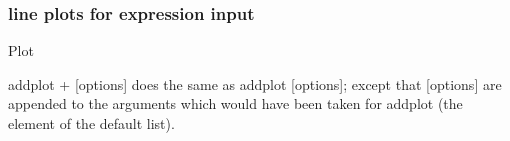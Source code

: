 \documentclass{beamer}
\begin{document}
\begin{frame}[fragile]
\frametitle{line plots for expression input}
\begin{block}{Plot}
\end{block}
\end{frame}
\begin{frame}[fragile]
\color{blue} addplot \color{black} + [options] does the same as \color{blue} addplot \color{black} [options]; except that [options] are appended to the arguments which would have been taken for \color{blue} addplot \color{black} (the element of the default list).
\end{frame}
\end{document}
